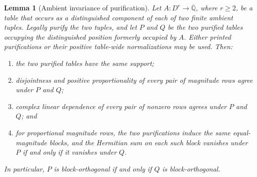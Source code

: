 \documentclass[11pt]{article}
\theoremstyle{plain}
\newtheorem{lemma}[lemma]{Lemma}
\theoremstyle{definition}
\theoremstyle{remark}
\newcommand{\AlgNums}{\overline{\mathbb Q}}
\begin{document}
\begin{lemma}[Ambient invariance of purification]
\label{lem:purification-invariance}
Let $A:D^r\to\AlgNums$, where $r\ge2$, be a table that occurs as a
distinguished component of each of two finite ambient tuples.  Legally purify
the two tuples, and let $P$ and $Q$ be the two purified tables occupying the
distinguished position formerly occupied by $A$.  Either printed
purifications or their positive table-wide normalizations may be used.  Then:
\begin{enumerate}
  \item the two purified tables have the same support;
  \item disjointness and positive proportionality of every pair of magnitude
        rows agree under $P$ and $Q$;
  \item complex linear dependence of every pair of nonzero rows agrees under
        $P$ and $Q$; and
  \item for proportional magnitude rows, the two purifications induce the
        same equal-magnitude blocks, and the Hermitian sum on each such block
        vanishes under $P$ if and only if it vanishes under $Q$.
\end{enumerate}
In particular, $P$ is block-orthogonal if and only if $Q$ is
block-orthogonal.
\end{lemma}
\end{document}
